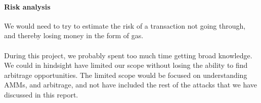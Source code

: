 \paragraph{Risk analysis} We would need to try to estimate the risk of a
transaction not going through, and thereby losing money in the form of gas.\\\\
During this project, we probably spent too much time getting broad knowledge. We
could in hindsight have limited our scope without losing the ability to find
arbitrage opportunities. The limited scope would be focused on understanding
AMMs, and arbitrage, and not have included the rest of the attacks that we have
discussed in this report.
